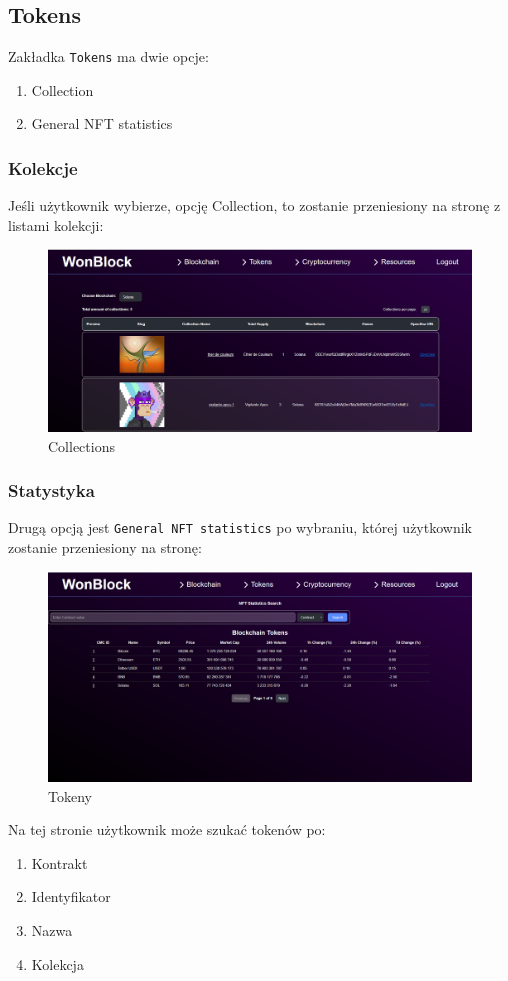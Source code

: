 \subsection{Tokens}
Zakładka \texttt{Tokens} ma dwie opcje:
\begin{enumerate}
    \item Collection
    \item General NFT statistics
\end{enumerate}
\subsubsection{Kolekcje}
Jeśli użytkownik wybierze, opcję Collection, to zostanie przeniesiony na stronę z listami kolekcji:
\begin{figure}[htb]
    \centering
    \includegraphics[width=0.8\linewidth]{./instrukcja/Collections.png}
    \caption{Collections}
    \label{fig:Collections}
\end{figure}
\subsubsection{Statystyka}
Drugą opcją jest \texttt{General NFT statistics} po wybraniu, której użytkownik zostanie przeniesiony na stronę:
\begin{figure}[htb]
    \centering
    \includegraphics[width=0.8\linewidth]{./instrukcja/Tokens.png}
    \caption{Tokeny}
    \label{fig:Tokeny}
\end{figure}
Na tej stronie użytkownik może szukać tokenów po:
\begin{enumerate}
    \item Kontrakt
    \item Identyfikator
		\item Nazwa
		\item Kolekcja
\end{enumerate}

